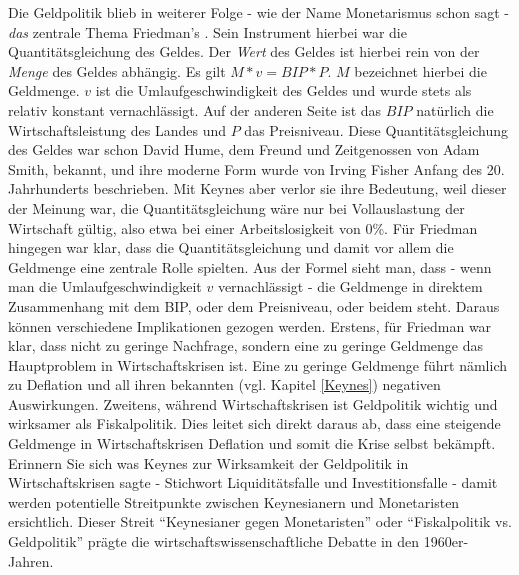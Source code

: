 Die Geldpolitik blieb in weiterer Folge - wie der Name Monetarismus schon sagt - \textit{das} zentrale Thema Friedman's \parencite{Friedman1968}. Sein Instrument hierbei war die Quantitätsgleichung des Geldes. Der \textit{Wert} des Geldes ist hierbei rein von der \textit{Menge} des Geldes abhängig. Es gilt $ M * v = BIP * P$. $M$ bezeichnet hierbei die Geldmenge. $v$ ist die Umlaufgeschwindigkeit des Geldes und wurde stets als relativ konstant vernachlässigt. Auf der anderen Seite ist das $BIP$ natürlich die Wirtschaftsleistung des Landes und $P$ das Preisniveau. Diese Quantitätsgleichung des Geldes war  schon David Hume, dem Freund und Zeitgenossen von Adam Smith, bekannt, und ihre moderne Form wurde von Irving Fisher \parencite{Fisher1911} Anfang des 20. Jahrhunderts beschrieben. Mit Keynes aber verlor sie ihre Bedeutung, weil dieser der Meinung war, die Quantitätsgleichung wäre nur bei Vollauslastung der Wirtschaft gültig, also etwa bei einer Arbeitslosigkeit von 0\%.
Für Friedman hingegen war klar, dass die Quantitätsgleichung und damit vor allem die Geldmenge eine zentrale Rolle spielten. Aus der Formel sieht man, dass - wenn man die Umlaufgeschwindigkeit $v$ vernachlässigt - die Geldmenge in direktem Zusammenhang mit dem BIP, oder dem Preisniveau, oder beidem steht. Daraus können verschiedene Implikationen gezogen werden. 
Erstens, für Friedman war klar, dass nicht zu geringe Nachfrage, sondern eine zu geringe Geldmenge das Hauptproblem in Wirtschaftskrisen ist. Eine zu geringe Geldmenge führt nämlich zu Deflation und all ihren bekannten (vgl. Kapitel \ref{Keynes}) negativen Auswirkungen.
Zweitens, während Wirtschaftskrisen ist Geldpolitik wichtig und wirksamer als Fiskalpolitik. Dies leitet sich direkt daraus ab, dass eine steigende Geldmenge in Wirtschaftskrisen Deflation und somit die Krise selbst bekämpft. Erinnern Sie sich was Keynes zur Wirksamkeit der Geldpolitik in Wirtschaftskrisen sagte - Stichwort Liquiditätsfalle und Investitionsfalle - damit werden potentielle Streitpunkte zwischen Keynesianern und Monetaristen ersichtlich. Dieser Streit "`Keynesianer gegen Monetaristen"' oder "`Fiskalpolitik vs. Geldpolitik"' prägte die wirtschaftswissenschaftliche Debatte in den 1960er-Jahren. 

